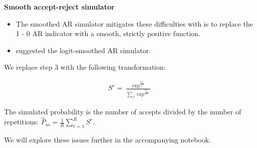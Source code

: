 \begin{frame}\textbf{Smooth accept-reject simulator}\vspace{0.3cm}

\begin{itemize}\setlength\itemsep{1em}
\item The smoothed AR simulator mitigates these difficulties with is to replace the 1 - 0 AR indicator with a smooth, strictly positive function.\\

\item {} suggested the logit-smoothed AR simulator.
\end{itemize}
\end{frame}

\begin{frame}
  We replace step 3 with the following transformation:

  \begin{align*}
    S^r = \frac{\exp^{\tfrac{U^r_{ni}}{\lambda}}}{\sum_J\exp^{\tfrac{U^r_{nj}}{\lambda}}}
  \end{align*}

  The simulated probability is the number of accepts divided by the number of repetitions: $\hat{P}_{ni} = \frac{1}{R} \sum^R_{r=1} S^r$.

\end{frame}
\begin{frame}

We will explore these issues further in the accompanying notebook.

\end{frame}
